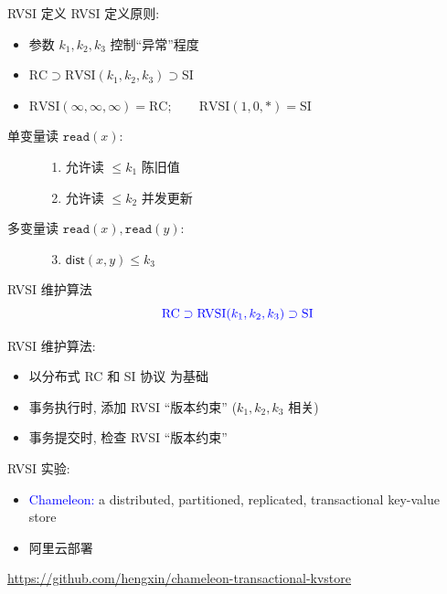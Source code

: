 \begin{frame}{RVSI 定义}
  RVSI 定义原则:
  \begin{itemize}
    \item 参数 $k_1, k_2, k_3$ 控制``异常''程度
    \item $\text{RC} \supset \text{RVSI}(k_1, k_2, k_3) \supset \text{SI}$
    \item $\text{RVSI}(\infty,\infty,\infty) = \text{RC}; \qquad \text{RVSI}(1,0,\ast) = \text{SI}$
  \end{itemize}

  \begin{cdef}
    \begin{description}
      \item[单变量读 $\texttt{read}(x)$:] \hfill 
        \begin{enumerate}
          \item 允许读 $\le k_1$ 陈旧值
          \item 允许读 $\le k_2$ 并发更新
        \end{enumerate}
      \item[多变量读 $\texttt{read}(x), \texttt{read}{(y)}$:] \hfill
        \begin{enumerate}
          \setcounter{enumi}{2}
          \item $\textsf{dist}(x,y) \le k_3$
        \end{enumerate}
    \end{description}
  \end{cdef}
\end{frame}


\begin{frame}{RVSI 维护算法}
  \[
    \textcolor{blue}{\text{RC} \supset \text{RVSI}(k_1, k_2, k_3) \supset \text{SI}}
  \]

  \vspace{0.10cm}

  RVSI 维护算法:
  \begin{itemize}
    \item 以分布式 RC 和 SI 协议 为基础
    \item 事务执行时, 添加 RVSI ``版本约束'' ($k_1, k_2, k_3$ 相关)
    \item 事务提交时, 检查 RVSI ``版本约束''
  \end{itemize}

  \pause

  \vspace{0.30cm}
  RVSI 实验:
  \begin{itemize}
    \item \textcolor{blue}{Chameleon:} a distributed, partitioned, replicated, transactional key-value store
    \item 阿里云部署
  \end{itemize}

  \textcolor{red}{\small \url{https://github.com/hengxin/chameleon-transactional-kvstore}}
\end{frame}
